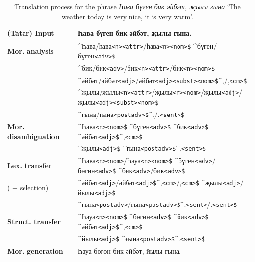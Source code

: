 \documentclass[11pt]{article}
\newcommand{\tag}[1]{{\small{\texttt{#1}}}}
\begin{document}
\begin{table}[htbp]
\centering
\begin{tabular}{ll}
\toprule
{\bf (Tatar) Input} & Һава бүген бик әйбәт, җылы гына. \\ 
\midrule
{\bf Mor. analysis} & \^{}Һава/һава\tag{<n>}\tag{<attr>}/һава\tag{<n>}\tag{<nom>\$} \^{}бүген/бүген\tag{<adv>\$}  \\
 ~             & \^{}бик/бик\tag{<adv>}/бик\tag{<n>}\tag{<attr>}/бик\tag{<n>}\tag{<nom>\$} \\ 
 ~             & \^{}әйбәт/әйбәт\tag{<adj>}/әйбәт\tag{<adj>}\tag{<subst>}\tag{<nom>\$}\^{},/,\tag{<cm>\$} \\ 
 ~             & \^{}җылы/җылы\tag{<n>}\tag{<attr>}/җылы\tag{<n>}\tag{<nom>}/җылы\tag{<adj>}/җылы\tag{<adj>}\tag{<subst>}\tag{<nom>\$} \\
 ~             & \^{}гына/гына\tag{<postadv>\$}\^{}./.\tag{<sent>\$} \\
\midrule
{\bf Mor. disambiguation}& \^{}Һава\tag{<n>}\tag{<nom>\$} \^{}бүген\tag{<adv>\$} \^{}бик\tag{<adv>\$} \^{}әйбәт\tag{<adj>\$}\^{},\tag{<cm>\$} \\ 
 ~                  & \^{}җылы\tag{<adj>\$} \^{}гына\tag{<postadv>\$}\^{}.\tag{<sent>\$}\\
\midrule
{\bf Lex. transfer} & \^{}Һава\tag{<n>}\tag{<nom>}/Һауа\tag{<n>}\tag{<nom>\$} \^{}бүген\tag{<adv>}/бөгөн\tag{<adv>\$} \^{}бик\tag{<adv>}/бик\tag{<adv>\$} \\
( + selection)                     & \^{}әйбәт\tag{<adj>}/әйбәт\tag{<adj>\$}\^{},\tag{<cm>}/,\tag{<cm>\$} \^{}җылы\tag{<adj>}/йылы\tag{<adj>\$} \\ 
~                     & \^{}гына\tag{<postadv>}/ғына\tag{<postadv>\$}\^{}.\tag{<sent>}/.\tag{<sent>\$}\\
\midrule
{\bf Struct. transfer}& \^{}Һауа\tag{<n>}\tag{<nom>\$} \^{}бөгөн\tag{<adv>\$} \^{}бик\tag{<adv>\$} \^{}әйбәт\tag{<adj>\$}\^{},\tag{<cm>\$} \\ 
~                    & \^{}йылы\tag{<adj>\$} \^{}ғына\tag{<postadv>\$}\^{}.\tag{<sent>\$}\\
\midrule
{\bf Mor. generation} & Һауа бөгөн бик әйбәт, йылы ғына. \\
\bottomrule
\end{tabular}
 \caption{Translation process for the phrase \emph{Һава бүген бик әйбәт, җылы гына} `The weather today is very nice, it is very warm'.}
\end{table}
\end{document}
